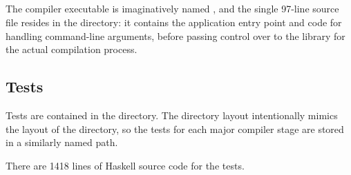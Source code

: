 \documentclass[dissertation.tex]{subfiles}
\begin{document}
{    \subsection{}
    {
        \begin{minipage}{0.7\textwidth}
        \vspace{0pt}
        The compiler executable is imaginatively named , and the single 97-line source file
         resides in the  directory: it contains the application entry point and code
        for handling command-line arguments, before passing control over to the  library for the
        actual compilation process.
        \end{minipage}
        \hspace{5mm}
        \begin{minipage}{0.2\textwidth}
        \vspace{-1.5cm}
        \footnotesize
        \raisebox{-\height}{\directorystructure{
        [app/
            [Main.hs]
        ]
        }}
        \end{minipage}
    }
    \subsection{Tests}
    {
        \begin{minipage}{0.7\textwidth}
        \vspace{-6.5cm}
        Tests are contained in the  directory. The directory layout intentionally mimics the layout of
        the  directory, so the tests for each major compiler stage are stored in a similarly named path.

        There are 1418 lines of Haskell source code for the tests.
        \end{minipage}
        \hspace{5mm}
        \begin{minipage}{0.2\textwidth}
        \vspace{0pt}
        \footnotesize
        \end{minipage}
    }
}
\end{document}
